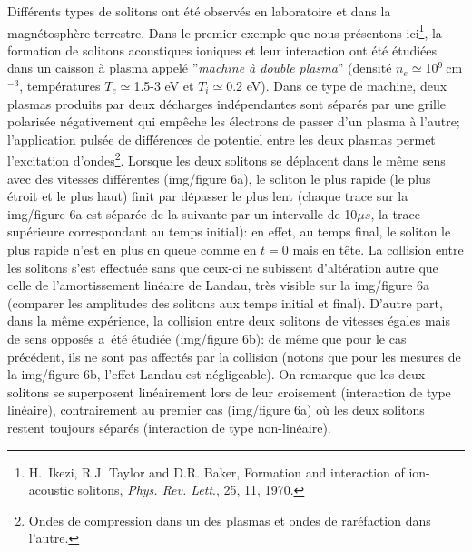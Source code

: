 \documentclass[10pt,thmsa]{article}
\begin{document}
Diff\'{e}rents types de solitons ont \'{e}t\'{e} observ\'{e}s en laboratoire
et dans la magn\'{e}tosph\`{e}re terrestre. Dans le premier exemple que nous
pr\'{e}sentons ici\footnote{{\small H.\ Ikezi, R.J. Taylor and D.R. Baker,
Formation and interaction of ion-acoustic solitons, \textit{Phys. Rev. Lett}.,
25, 11, 1970.}}, la formation de solitons acoustiques ioniques et leur
interaction ont \'{e}t\'{e} \'{e}tudi\'{e}es dans un caisson \`{a} plasma
appel\'{e} ''\textit{machine \`{a} double plasma}'' (densit\'{e} $n_{e}\simeq
$10$^{9}\ $cm$^{-3}$, temp\'{e}ratures $T_{e}\simeq$1.5-3 eV et $T_{i}\simeq
$0.2 eV). Dans ce type de machine, deux plasmas produits par deux
d\'{e}charges ind\'{e}pendantes sont s\'{e}par\'{e}s par une grille
polaris\'{e}e n\'{e}gativement qui emp\^{e}che les \'{e}lectrons de passer
d'un plasma \`{a} l'autre; l'application puls\'{e}e de diff\'{e}rences de
potentiel entre les deux plasmas permet l'excitation d'ondes\footnote{Ondes de
compression dans un des plasmas et ondes de rar\'{e}faction dans l'autre.}.
Lorsque les deux solitons se d\'{e}placent dans le m\^{e}me sens avec des
vitesses diff\'{e}rentes (img/figure 6a), le soliton le plus rapide (le plus
\'{e}troit et le plus haut) finit par d\'{e}passer le plus lent (chaque trace
sur la img/figure 6a est s\'{e}par\'{e}e de la suivante par un intervalle de
10$\mu s$, la trace sup\'{e}rieure correspondant au temps initial): en effet,
au temps final, le soliton le plus rapide n'est en plus en queue comme en
$t=0$ mais en t\^{e}te. La collision entre les solitons s'est effectu\'{e}e
sans que ceux-ci ne subissent d'alt\'{e}ration autre que celle de
l'amortissement lin\'{e}aire de Landau, tr\`{e}s visible sur la img/figure 6a
(comparer les amplitudes des solitons aux temps initial et final). D'autre
part, dans la m\^{e}me exp\'{e}rience, la collision entre deux solitons de
vitesses \'{e}gales mais de sens oppos\'{e}s a\ \'{e}t\'{e} \'{e}tudi\'{e}e
(img/figure 6b): de m\^{e}me que pour le cas pr\'{e}c\'{e}dent, ils ne sont pas
affect\'{e}s par la collision (notons que pour les mesures de la img/figure 6b,
l'effet Landau est n\'{e}gligeable). On remarque que les deux solitons se
superposent lin\'{e}airement lors de leur croisement (interaction de type
lin\'{e}aire), contrairement au premier cas (img/figure 6a) o\`{u} les deux
solitons restent toujours s\'{e}par\'{e}s (interaction de type non-lin\'{e}aire).
\end{document}
